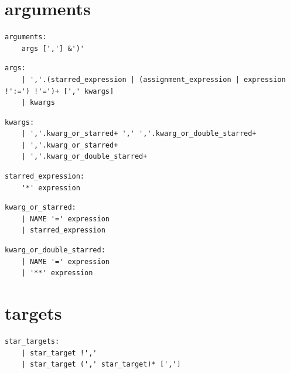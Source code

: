 \section{arguments}

\noindent\textbf{\texttt{}}\par
\begin{lstlisting}
arguments:
    args [','] &')'
\end{lstlisting}

\noindent\textbf{\texttt{}}\par
\begin{lstlisting}
args:
    | ','.(starred_expression | (assignment_expression | expression !':=') !'=')+ [',' kwargs]
    | kwargs
\end{lstlisting}

\noindent\textbf{\texttt{}}\par
\begin{lstlisting}
kwargs:
    | ','.kwarg_or_starred+ ',' ','.kwarg_or_double_starred+
    | ','.kwarg_or_starred+
    | ','.kwarg_or_double_starred+
\end{lstlisting}

\noindent\textbf{\texttt{}}\par
\begin{lstlisting}
starred_expression:
    '*' expression
\end{lstlisting}

\noindent\textbf{\texttt{}}\par
\begin{lstlisting}
kwarg_or_starred:
    | NAME '=' expression
    | starred_expression
\end{lstlisting}

\noindent\textbf{\texttt{}}\par
\begin{lstlisting}
kwarg_or_double_starred:
    | NAME '=' expression
    | '**' expression
\end{lstlisting}

\section{targets}

\noindent\textbf{\texttt{}}\par
\begin{lstlisting}
star_targets:
    | star_target !','
    | star_target (',' star_target)* [',']
\end{lstlisting}

